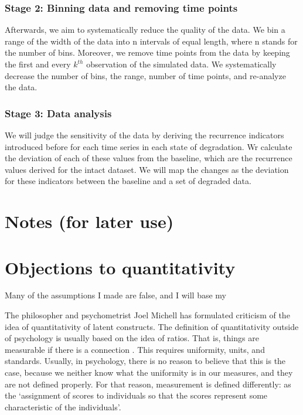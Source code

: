 \documentclass[utf8]{FrontiersinVancouver}
\begin{document}
\subsubsection{Stage 2: Binning data and removing time points}

Afterwards, we aim to systematically reduce the quality of the data. We bin a range of the width of the data into n intervals of equal length, where n stands for the number of bins. Moreover, we remove time points from the data by keeping the first and every $k^{th}$ observation of the simulated data. We systematically decrease the number of bins, the range, number of time points, and re-analyze the data.

\subsubsection{Stage 3: Data analysis}
We will judge the sensitivity of the data by deriving the recurrence indicators introduced before for each time series in each state of degradation. Wr calculate the deviation of each of these values from the baseline, which are the recurrence values derived for the intact dataset. We will map the changes as the deviation for these indicators between the baseline and a set of degraded data.




\section{Notes (for later use)}
\section{Objections to quantitativity}
Many of the assumptions I made are false, and I will base my 

The philosopher and psychometrist Joel Michell has formulated criticism of the idea of quantitativity of latent constructs. The definition of quantitativity outside of psychology is usually based on the idea of ratios. That is, things are measurable if there is a connection . This requires uniformity, units, and standards. Usually, in psychology, there is no reason to believe that this is the case, because we neither know what the uniformity is in our measures, and they are not defined properly. For that reason, measurement is defined differently: as the `assignment of scores to individuals so that the scores represent some characteristic of the individuals'. 
\end{document}
